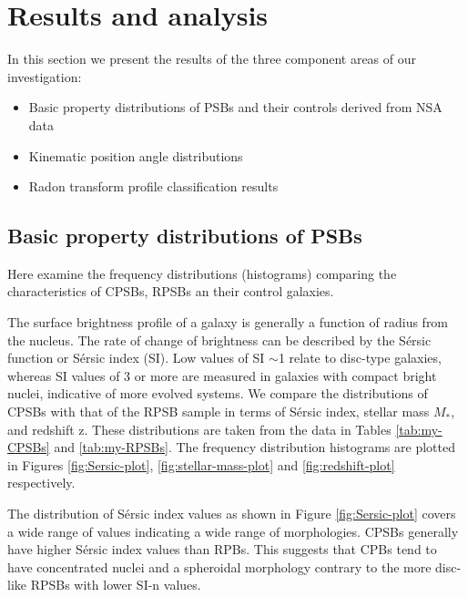 \section{Results and analysis}
\label{sec:results}

In this section we present the results of the three component areas of our investigation:

\begin{itemize}
    \item Basic property distributions of PSBs and their controls derived from NSA data
    \item Kinematic position angle distributions
    \item Radon transform profile classification results
\end{itemize}

\subsection{Basic property distributions of PSBs}
\label{sec:property-distributions}
Here examine the frequency distributions (histograms) comparing the characteristics of CPSBs, RPSBs an their control galaxies.

The surface brightness profile of a galaxy is generally a function of radius from the nucleus. The rate of change of brightness can be described by the S\'ersic function or S\'ersic  index (SI). Low values of SI $\sim$1 relate to disc-type galaxies, whereas SI values of 3 or more are measured in galaxies with compact bright nuclei, indicative of more evolved systems. We compare the distributions of CPSBs with that of the RPSB sample in terms of S\'ersic index, stellar mass $M_*$, and redshift z. These distributions are taken from the data in Tables \ref{tab:my-CPSBs} and \ref{tab:my-RPSBs}. The frequency distribution histograms are plotted in Figures \ref{fig:Sersic-plot}, \ref{fig:stellar-mass-plot} and \ref{fig:redshift-plot} respectively.

The distribution of S\'ersic index values as shown in Figure \ref{fig:Sersic-plot} covers a wide range of values indicating a wide range of morphologies. CPSBs  generally have higher S\'ersic index values than RPBs. This suggests that CPBs tend to have concentrated nuclei and a spheroidal morphology contrary to the more disc-like RPSBs with lower SI-n values.

